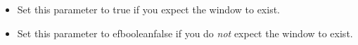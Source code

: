 \begin{itemize}
\item Set this parameter to true if you expect the window to exist.
\item Set this parameter to \jb{}efbooleanfalse if you do \emph{not} expect the window to exist.
\end{itemize}
